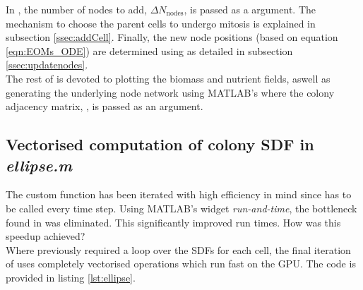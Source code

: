 In , the number of nodes to add, $\Delta N_{\textrm{nodes}}$, is passed 
as a argument. The mechanism to choose the parent cells to undergo mitosis is 
explained in subsection \ref{ssec:addCell}. Finally, 
the new node positions (based on equation \ref{eqn:EOMs_ODE}) are determined 
using  as detailed in subsection \ref{ssec:updatenodes}.
\\

The rest of  is devoted to plotting the biomass and nutrient 
fields, aswell as generating the underlying node network using MATLAB's 
 where the colony adjacency matrix, ,
is passed as an argument.


\subsection{Vectorised computation of colony SDF in \textit{ellipse.m}}\label{ssec:ellipse}
The custom function  has been iterated
with high efficiency in mind since  has to be called 
every time step. Using MATLAB's widget \textit{run-and-time}, the bottleneck found
in  was eliminated. This significantly 
improved run times. How was this speedup achieved?
\\

Where previously  required a  loop over the SDFs for 
each cell, the final iteration of  uses 
completely vectorised operations which run fast on the GPU. The code is 
provided in listing \ref{lst:ellipse}.


